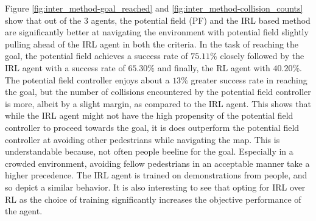 Figure \ref{fig:inter_method-goal_reached} and \ref{fig:inter_method-collision_counts} show that out of the 3 agents, the potential field (PF) and the IRL based method are significantly better at navigating the environment with potential field slightly pulling ahead of the IRL agent in both the criteria. In the task of reaching the goal, the potential field achieves a success rate of $75.11\%$ closely followed by the IRL agent with a success rate of  $65.30\%$ and finally, the RL agent with $40.20\%$. The potential field controller enjoys about a $13\%$ greater success rate in reaching the goal, but the number of collisions encountered by the potential field controller is more, albeit by a slight margin, as compared to the IRL agent. This shows that while the IRL agent might not have the high propensity of the potential field controller to proceed towards the goal, it is does outperform the potential field controller at avoiding other pedestrians while navigating the map. This is understandable because, not often people beeline for the goal. Especially in a crowded environment, avoiding fellow pedestrians in an acceptable manner take a higher precedence. The IRL agent is trained on demonstrations from people, and so depict a similar behavior.  %
It is also interesting to see that opting for IRL over RL as the choice of training significantly increases the objective performance of the agent.


